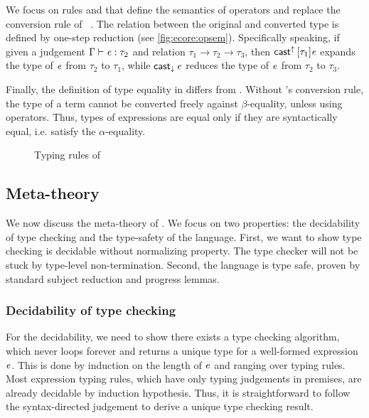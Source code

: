 We focus on rules  and  that define the semantics of \cast operators and replace the conversion rule of \cc~. The relation between the original and converted type is defined by one-step reduction (see \ref{fig:ecore:opsem}). Specifically speaking, if given a judgement $\Gamma  \vdash  \mathit{e}  :  \tau_{{\mathrm{2}}}$ and relation $\tau_{{\mathrm{1}}}  \longrightarrow  \tau_{{\mathrm{2}}}  \longrightarrow  \tau_{{\mathrm{3}}}$, then $\mathsf{cast}^{\uparrow} \, [  \tau_{{\mathrm{1}}}  ]  \mathit{e}$ expands the type of $\mathit{e}$ from $\tau_{{\mathrm{2}}}$ to $\tau_{{\mathrm{1}}}$, while $\mathsf{cast}_{\downarrow} \, \mathit{e}$ reduces the type of $\mathit{e}$ from $\tau_{{\mathrm{2}}}$ to $\tau_{{\mathrm{3}}}$.

Finally, the definition of type equality in \ecore differs from \cc. Without \cc's conversion rule, the type of a term cannot be converted freely against $\beta$-equality, unless using \cast operators. Thus, types of expressions are equal only if they are syntactically equal, i.e. satisfy the $\alpha$-equality.

\begin{figure}
    \ottdefnctx{}
    \ottdefnexpr{}
    \caption{Typing rules of \ecore}
    \label{fig:ecore:typing}
\end{figure}

\subsection{Meta-theory}\label{sec:ecore:meta}
We now discuss the meta-theory of \ecore. We focus on two properties: the decidability of type checking and the type-safety of the language. First, we want to show type checking \ecore is decidable without normalizing property. The type checker will not be stuck by type-level non-termination. Second, the language is type safe, proven by standard subject reduction and progress lemmas.

\subsubsection{Decidability of type checking}
For the decidability, we need to show there exists a type checking algorithm, which never loops forever and returns a unique type for a well-formed expression $\mathit{e}$. This is done by induction on the length of $\mathit{e}$ and ranging over typing rules. Most expression typing rules, which have only typing judgements in premises, are already decidable by induction hypothesis. Thus, it is straightforward to follow the syntax-directed judgement to derive a unique type checking result.

